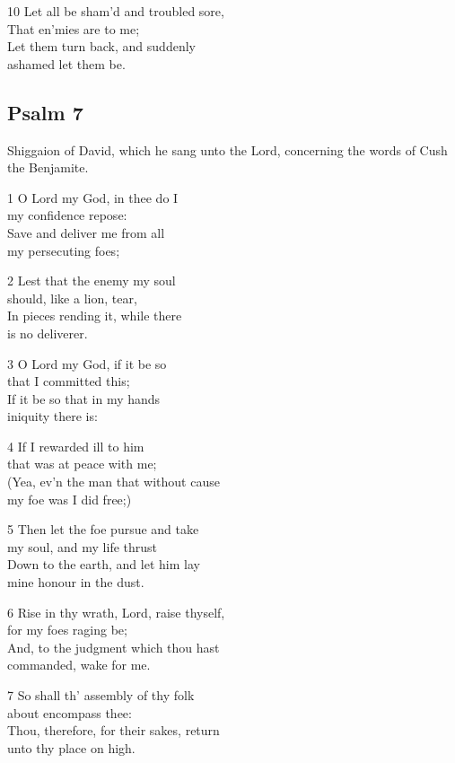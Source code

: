 10 Let all be sham’d and troubled sore,\\
That en’mies are to me;\\
Let them turn back, and suddenly\\
ashamed let them be.

\begin{center}
\quad{}\quad{}
\end{center}


\subsection*{Psalm 7}


Shiggaion of David, which he sang unto the Lord,
concerning the words of Cush the Benjamite.

1 O Lord my God, in thee do I\\
my confidence repose:\\
Save and deliver me from all\\
my persecuting foes;

2 Lest that the enemy my soul\\
should, like a lion, tear,\\
In pieces rending it, while there\\
is no deliverer.

3 O Lord my God, if it be so\\
that I committed this;\\
If it be so that in my hands\\
iniquity there is:

4 If I rewarded ill to him\\
that was at peace with me;\\
(Yea, ev’n the man that without cause\\
my foe was I did free;)

5 Then let the foe pursue and take\\
my soul, and my life thrust\\
Down to the earth, and let him lay\\
mine honour in the dust.

6 Rise in thy wrath, Lord, raise thyself,\\
for my foes raging be;\\
And, to the judgment which thou hast\\
commanded, wake for me.

7 So shall th’ assembly of thy folk\\
about encompass thee:\\
Thou, therefore, for their sakes, return\\
unto thy place on high.

